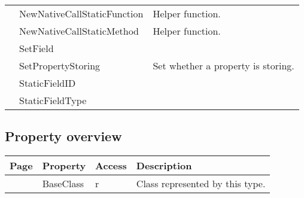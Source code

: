 \begin{tabularx}{\textwidth}{llX}
\pageref{thoriumcorepkg:thorium:tthoriumrttiobjecttype:newnativecallstaticfunction} & NewNativeCallStaticFunction  & Helper function. \\
\pageref{thoriumcorepkg:thorium:tthoriumrttiobjecttype:newnativecallstaticmethod} & NewNativeCallStaticMethod  & Helper function. \\
\pageref{thoriumcorepkg:thorium:tthoriumrttiobjecttype:setfield} & SetField  &  \\
\pageref{thoriumcorepkg:thorium:tthoriumrttiobjecttype:setpropertystoring} & SetPropertyStoring  & Set whether a property is storing. \\
\pageref{thoriumcorepkg:thorium:tthoriumrttiobjecttype:staticfieldid} & StaticFieldID  &  \\
\pageref{thoriumcorepkg:thorium:tthoriumrttiobjecttype:staticfieldtype} & StaticFieldType  &  \\
\hline
\end{tabularx}
\subsection{Property overview}
\label{thoriumcorepkg:thorium:tthoriumrttiobjecttype:properties}
\begin{tabularx}{\textwidth}{lllX}
Page & Property & Access & Description \\ \hline
\pageref{thoriumcorepkg:thorium:tthoriumrttiobjecttype:baseclass} & BaseClass & r & Class represented by this type. \\
\hline
\end{tabularx}
